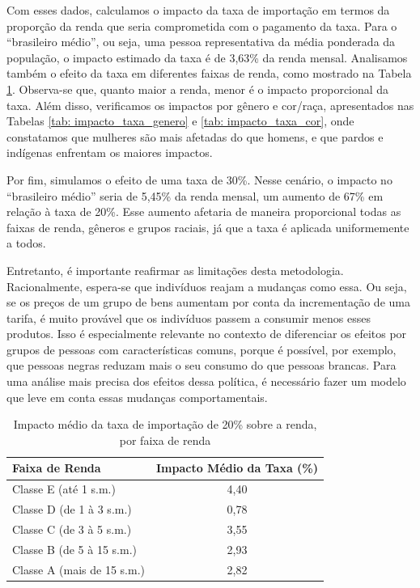 \documentclass[12pt, a4paper, openany]{book}
\numberwithin{equation}{chapter}
\numberwithin{table}{chapter}
\numberwithin{figure}{chapter}
\theoremstyle{break}
\begin{document}
Com esses dados, calculamos o impacto da taxa de importação em termos da proporção da renda que seria comprometida com o pagamento da taxa. Para o ``brasileiro médio'', ou seja, uma pessoa representativa da média ponderada da população, o impacto estimado da taxa é de 3,63\% da renda mensal. Analisamos também o efeito da taxa em diferentes faixas de renda, como mostrado na Tabela \ref{tab: impacto_taxa}. Observa-se que, quanto maior a renda, menor é o impacto proporcional da taxa. Além disso, verificamos os impactos por gênero e cor/raça, apresentados nas Tabelas \ref{tab: impacto_taxa_genero} e \ref{tab: impacto_taxa_cor}, onde constatamos que mulheres são mais afetadas do que homens, e que pardos e indígenas enfrentam os maiores impactos.

Por fim, simulamos o efeito de uma taxa de 30\%. Nesse cenário, o impacto no ``brasileiro médio'' seria de 5,45\% da renda mensal, um aumento de 67\% em relação à taxa de 20\%. Esse aumento afetaria de maneira proporcional todas as faixas de renda, gêneros e grupos raciais, já que a taxa é aplicada uniformemente a todos.

Entretanto, é importante reafirmar as limitações desta metodologia. Racionalmente, espera-se que indivíduos reajam a mudanças como essa. Ou seja, se os preços de um grupo de bens aumentam por conta da incrementação de uma tarifa, é muito provável que os indivíduos passem a consumir menos esses produtos. Isso é especialmente relevante no contexto de diferenciar os efeitos por grupos de pessoas com características comuns, porque é possível, por exemplo, que pessoas negras reduzam mais o seu consumo do que pessoas brancas. Para uma análise mais precisa dos efeitos dessa política, é necessário fazer um modelo que leve em conta essas mudanças comportamentais.

\begin{table}[H]
\centering
\begin{tabular}{l|c}
\textbf{Faixa de Renda} & \textbf{Impacto Médio da Taxa (\%)} \\ \hline
Classe E (até 1 s.m.)                     & 4,40                               \\ \hline
Classe D (de 1 à 3 s.m.)                   & 0,78                              \\ \hline
Classe C (de 3 à 5 s.m.)                  & 3,55                              \\ \hline
Classe B (de 5 à 15 s.m.)                 & 2,93                              \\ \hline
Classe A (mais de 15 s.m.)                & 2,82
\end{tabular}
\caption{Impacto médio da taxa de importação de 20\% sobre a renda, por faixa de renda}
\label{tab: impacto_taxa}
\end{table}
\end{document}
